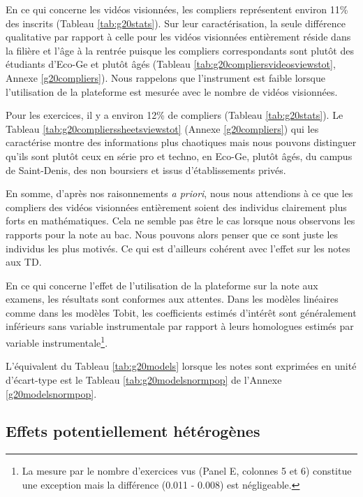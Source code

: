 \documentclass[
]{book}
\begin{document}
En ce qui concerne les vidéos visionnées, les compliers représentent environ 11\% des inscrits (Tableau \ref{tab:g20stats}). Sur leur caractérisation, la seule différence qualitative par rapport à celle pour les vidéos visionnées entièrement réside dans la filière et l'âge à la rentrée puisque les compliers correspondants sont plutôt des étudiants d'Eco-Ge et plutôt âgés (Tableau \ref{tab:g20compliersvideosviewstot}, Annexe \ref{g20compliers}). Nous rappelons que l'instrument est faible lorsque l'utilisation de la plateforme est mesurée avec le nombre de vidéos visionnées.

Pour les exercices, il y a environ 12\% de compliers (Tableau \ref{tab:g20stats}). Le Tableau \ref{tab:g20complierssheetsviewstot} (Annexe \ref{g20compliers}) qui les caractérise montre des informations plus chaotiques mais nous pouvons distinguer qu'ils sont plutôt ceux en série pro et techno, en Eco-Ge, plutôt âgés, du campus de Saint-Denis, des non boursiers et issus d'établissements privés.

En somme, d'après nos raisonnements \emph{a priori}, nous nous attendions à ce que les compliers des vidéos visionnées entièrement soient des individus clairement plus forts en mathématiques. Cela ne semble pas être le cas lorsque nous observons les rapports pour la note au bac. Nous pouvons alors penser que ce sont juste les individus les plus motivés. Ce qui est d'ailleurs cohérent avec l'effet sur les notes aux TD.

\quad En ce qui concerne l'effet de l'utilisation de la plateforme sur la note aux examens, les résultats sont conformes aux attentes. Dans les modèles linéaires comme dans les modèles Tobit, les coefficients estimés d'intérêt sont généralement inférieurs sans variable instrumentale par rapport à leurs homologues estimés par variable instrumentale\footnote{La mesure par le nombre d'exercices vus (Panel E, colonnes 5 et 6) constitue une exception mais la différence (0.011 - 0.008) est négligeable.}.

\quad L'équivalent du Tableau \ref{tab:g20models} lorsque les notes sont exprimées en unité d'écart-type est le Tableau \ref{tab:g20modelsnormpop} de l'Annexe \ref{g20modelsnormpop}.

\hypertarget{g20reshetero}{%
\subsection{Effets potentiellement hétérogènes}\label{g20reshetero}}
\end{document}
